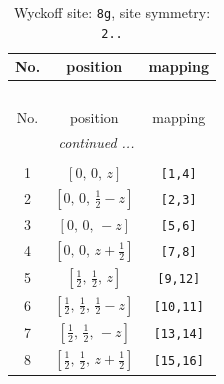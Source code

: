 \documentclass[fleqn,8pt]{jsarticle}
\begin{document}
\begin{longtable}{ccc}
\caption{Wyckoff site: {\tt 8g}, site symmetry: {\tt 2..}}
 \\
 \hline \hline
No. & position & mapping \\ \hline \endfirsthead

\multicolumn{2}{l}{\tablename\ \thetable{}} \\
 \hline \hline
No. & position & mapping \\ \hline \endhead

 \hline \hline
\multicolumn{2}{r}{\footnotesize\it continued ...} \\ \endfoot

 \hline \hline
\multicolumn{2}{r}{} \\ \endlastfoot

1 & $\left[ 0,\, 0,\, z \right]$ & {\tt [1,4]} \\ \hline
2 & $\left[ 0,\, 0,\, \frac{1}{2} - z \right]$ & {\tt [2,3]} \\ \hline
3 & $\left[ 0,\, 0,\, - z \right]$ & {\tt [5,6]} \\ \hline
4 & $\left[ 0,\, 0,\, z + \frac{1}{2} \right]$ & {\tt [7,8]} \\ \hline
5 & $\left[ \frac{1}{2},\, \frac{1}{2},\, z \right]$ & {\tt [9,12]} \\ \hline
6 & $\left[ \frac{1}{2},\, \frac{1}{2},\, \frac{1}{2} - z \right]$ & {\tt [10,11]} \\ \hline
7 & $\left[ \frac{1}{2},\, \frac{1}{2},\, - z \right]$ & {\tt [13,14]} \\ \hline
8 & $\left[ \frac{1}{2},\, \frac{1}{2},\, z + \frac{1}{2} \right]$ & {\tt [15,16]} \\
\end{longtable}
\renewcommand{\arraystretch}{1.2}
\end{document}
